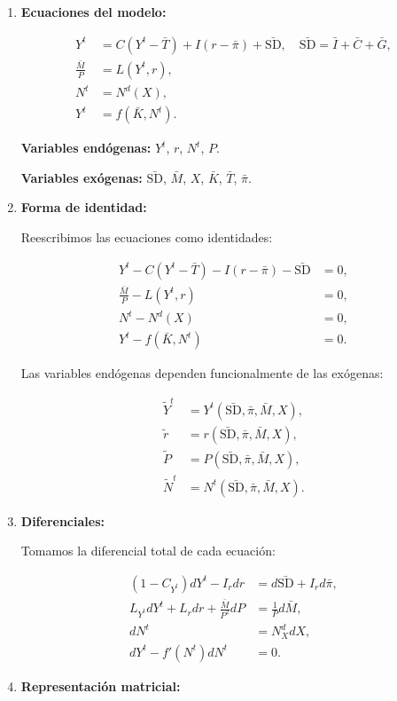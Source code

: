 \documentclass[
  doc,
  floatsintext,
  longtable,
  a4paper,
  nolmodern,
  notxfonts,
  notimes,
  12pt,
  colorlinks=true,linkcolor=blue,citecolor=blue,urlcolor=blue]{apa7}
\begin{document}
\begin{enumerate}
\def\labelenumi{\arabic{enumi}.}
\item
  \textbf{Ecuaciones del modelo:}

  \[
  \begin{aligned}
  Y^t &= C(Y^t - \bar{T}) + I(r - \bar{\pi}) + \bar{\mathrm{SD}}, \quad \bar{\mathrm{SD}} = \bar{I} + \bar{C} + \bar{G}, \\
  \frac{\bar{M}}{P} &= L(Y^t, r), \\
  N^t &= N^d(X), \\
  Y^t &= f(\bar{K}, N^t).
  \end{aligned}
  \]

  \textbf{Variables endógenas:} \(Y^t\), \(r\), \(N^t\), \(P\).

  \textbf{Variables exógenas:} \(\bar{\mathrm{SD}}\), \(\bar{M}\),
  \(X\), \(\bar{K}\), \(\bar{T}\), \(\bar{\pi}\).
\item
  \textbf{Forma de identidad:}

  Reescribimos las ecuaciones como identidades:

  \[
  \begin{aligned}
  Y^t - C(Y^t - \bar{T}) - I(r - \bar{\pi}) - \bar{\mathrm{SD}} &= 0, \\
  \frac{\bar{M}}{P} - L(Y^t, r) &= 0, \\
  N^t - N^d(X) &= 0, \\
  Y^t - f(\bar{K}, N^t) &= 0.
  \end{aligned}
  \]

  Las variables endógenas dependen funcionalmente de las exógenas:

  \[
  \begin{aligned}
  \tilde{Y}^t &= Y^t(\bar{\mathrm{SD}}, \bar{\pi}, \bar{M}, X), \\
  \tilde{r} &= r(\bar{\mathrm{SD}}, \bar{\pi}, \bar{M}, X), \\
  \tilde{P} &= P(\bar{\mathrm{SD}}, \bar{\pi}, \bar{M}, X), \\
  \tilde{N}^t &= N^t(\bar{\mathrm{SD}}, \bar{\pi}, \bar{M}, X).
  \end{aligned}
  \]
\item
  \textbf{Diferenciales:}

  Tomamos la diferencial total de cada ecuación:

  \[
  \begin{aligned}
  (1 - C_{Y^t}) dY^t - I_r dr &= d\bar{\mathrm{SD}} + I_r d\bar{\pi}, \\
  L_{Y^t} dY^t + L_r dr + \frac{\bar{M}}{P^2} dP &= \frac{1}{P} d\bar{M}, \\
  dN^t &= N^d_X dX, \\
  dY^t - f'(N^t) dN^t &= 0.
  \end{aligned}
  \]
\item
  \textbf{Representación matricial:}


\end{enumerate}
\end{document}
